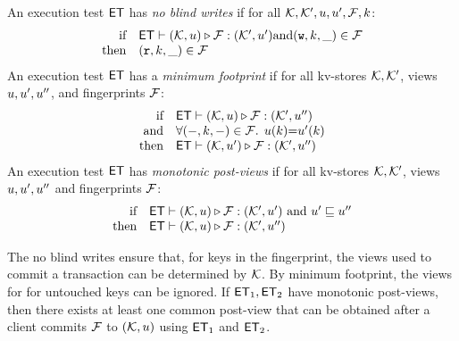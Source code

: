 \begin{definition}[$\ET$ properties]
\label{def:et_properties}
An execution test $\ET$ has \emph{no blind writes} if
for all $\mathcal{K}, \mathcal{K}', u, u', \mathcal{F}, k$:
\[
\begin{array}{@{} r @{\hspace{10pt}} l @{}}
\text{if} & \ET \vdash (\hh, \vi) \triangleright \opset: (\hh',\vi' ) 
\text{and} (\otW, \ke, \_) \in \opset \\
\text{then} & (\otR, \ke, \_) \in \opset
\end{array} 
\]
An execution test $\ET$ has a \emph{minimum footprint} if for all kv-stores $\mathcal{K}, \mathcal{K}'$,
views $u, u',u''$, and fingerprints $\mathcal{F}$: 
%
\[
\begin{array}{@{} r @{\hspace{10pt}} l @{}}
    \text{if} & \ET \vdash (\hh, \vi) \triangleright \opset : (\hh', \vi'')  \\
    \text{and} & \fora{(\stub, \ke, \stub) \in \f} \vi(\ke) {=} \vi'(\ke) \\
    \text{then} & \ET \vdash (\hh, \vi') \triangleright \opset : (\hh', \vi'')
\end{array} 
\]
%
An execution test $\ET$ has \emph{monotonic post-views} if 
for all kv-stores $\mathcal{K},\mathcal{K}'$, 
views $u, u',u''$ and fingerprints $\mathcal{F}$:
\[
\begin{array}{@{} r @{\hspace{10pt}} l @{}}
    \text{if} & \ET \vdash (\hh, \vi) \triangleright \opset : (\hh',\vi' )
    \text{ and } \vi' \sqsubseteq \vi''  \\
    \text{then} & \ET \vdash (\hh, \vi) \triangleright \opset : (\hh',\vi'')
\end{array} 
\]
\end{definition}
The no blind writes ensure that, for keys in the fingerprint, the views used to commit a transaction can be determined by $\mathcal{K}$. 
By minimum footprint, the views for for untouched keys can be ignored.
If $\mathsf{ET}_1, \mathsf{ET}_2$ have monotonic post-views, then there exists at least one common post-view 
that can be obtained after a client commits $\mathcal{F}$ to $(\mathcal{K}, u)$ using $\mathsf{ET}_1$ and $\mathsf{ET}_2$. 

